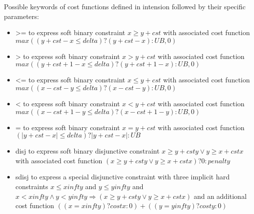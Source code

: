 \documentclass[letterpaper,10pt,openany,oneside,english]{sphinxmanual}
\begin{document}
\begin{fulllineitems}
\begin{itemize}
\end{itemize}


\sphinxAtStartPar
Possible keywords of cost functions defined in intension followed by their specific parameters:\begin{itemize}
\item {} 
\sphinxAtStartPar
\textgreater{}=   to express soft binary constraint \(x \geq y + cst\) with associated cost function \(max( (y + cst - x \leq delta)?(y + cst - x):UB , 0 )\)

\item {} 
\sphinxAtStartPar
\textgreater{}   to express soft binary constraint \(x > y + cst\) with associated cost function \(max( (y + cst + 1 - x \leq delta)?(y + cst + 1 - x):UB , 0 )\)

\item {} 
\sphinxAtStartPar
\textless{}=   to express soft binary constraint \(x \leq y + cst\) with associated cost function \(max( (x - cst - y \leq delta)?(x - cst - y):UB , 0 )\)

\item {} 
\sphinxAtStartPar
\textless{}   to express soft binary constraint \(x < y + cst\) with associated cost function \(max( (x - cst + 1 - y \leq delta)?(x - cst + 1 - y):UB , 0 )\)

\item {} 
\sphinxAtStartPar
=   to express soft binary constraint \(x = y + cst\) with associated cost function \((|y + cst - x| \leq delta)?|y + cst - x|:UB\)

\item {} 
\sphinxAtStartPar
disj    to express soft binary disjunctive constraint \(x \geq y + csty \vee y \geq x + cstx\) with associated cost function \((x \geq y + csty \vee y \geq x + cstx)?0:penalty\)

\item {} 
\sphinxAtStartPar
sdisj       to express a special disjunctive constraint with three implicit hard constraints \(x \leq xinfty\) and \(y \leq yinfty\) and \(x < xinfty \wedge y < yinfty \Rightarrow (x \geq y + csty \vee y \geq x + cstx)\) and an additional cost function \(((x = xinfty)?costx:0) + ((y= yinfty)?costy:0)\)


\end{itemize}
\end{fulllineitems}
\end{document}
